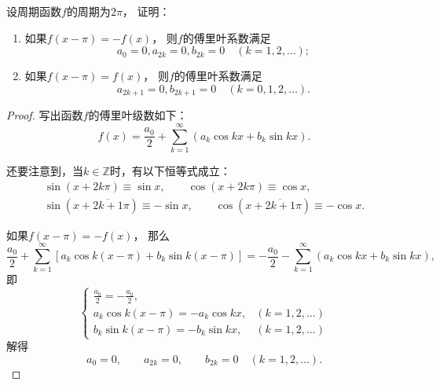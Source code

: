 \begin{example}
设周期函数\(f\)的周期为\(2\pi\)，
证明：\begin{enumerate}
\item 如果\(f(x-\pi) = -f(x)\)，
则\(f\)的傅里叶系数满足\begin{equation*}
	a_0 = 0,
	a_{2k} = 0,
	b_{2k} = 0
	\quad(k=1,2,\dotsc);
\end{equation*}
\item 如果\(f(x-\pi) = f(x)\)，
则\(f\)的傅里叶系数满足\begin{equation*}
	a_{2k+1} = 0,
	b_{2k+1} = 0
	\quad(k=0,1,2,\dotsc).
\end{equation*}
\end{enumerate}
\begin{proof}
写出函数\(f\)的傅里叶级数如下：\begin{equation*}
	f(x) = \frac{a_0}{2}
	+ \sum_{k=1}^\infty \left(
		a_k \cos kx
		+ b_k \sin kx
	\right).
\end{equation*}

还要注意到，当\(k\in\mathbb{Z}\)时，有以下恒等式成立：\begin{gather*}
	\sin(x+2k\pi) \equiv \sin x, \qquad
	\cos(x+2k\pi) \equiv \cos x, \\
	\sin(x+\overline{2k+1}\pi) \equiv -\sin x, \qquad
	\cos(x+\overline{2k+1}\pi) \equiv -\cos x.
\end{gather*}

如果\(f(x-\pi) = -f(x)\)，
那么\begin{equation*}
	\frac{a_0}{2} + \sum_{k=1}^\infty \left[
		a_k \cos k(x-\pi)
		+ b_k \sin k(x-\pi)
	\right]
	=
	-\frac{a_0}{2} - \sum_{k=1}^\infty \left(
		a_k \cos kx
		+ b_k \sin kx
	\right),
\end{equation*}
即\begin{equation*}
	\left\{ \begin{array}{ll}
		\frac{a_0}{2} = -\frac{a_0}{2}, \\
		a_k \cos k(x-\pi) = - a_k \cos kx, &(k=1,2,\dotsc) \\
		b_k \sin k(x-\pi) = - b_k \sin kx, &(k=1,2,\dotsc)
	\end{array} \right.
\end{equation*}
解得\begin{equation*}
	a_0 = 0, \qquad
	a_{2k} = 0, \qquad
	b_{2k} = 0
	\quad(k=1,2,\dotsc).
\end{equation*}


\end{proof}
\end{example}
